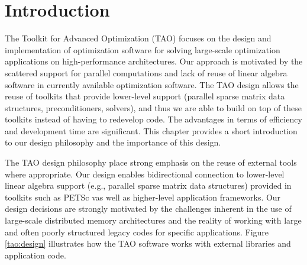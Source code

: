 \chapter{Introduction}
\label{chapter:introduction}


The Toolkit for Advanced Optimization (TAO) focuses on the design and
implementation of optimization software for 
solving large-scale optimization applications on high-performance
architectures.  Our approach is motivated by the scattered support for
parallel computations and lack of reuse of linear algebra software in
currently available optimization software.  The TAO design allows the
reuse of toolkits that provide lower-level support (parallel sparse
matrix data structures, preconditioners, solvers), and thus we are
able to build on top of these toolkits instead of having to redevelop
code. The advantages in terms of efficiency and development time are
significant.  This chapter provides a short introduction to our design 
philosophy and the importance of this design.



The TAO design philosophy place strong emphasis on the reuse of
external tools where appropriate.  Our design enables bidirectional
connection to lower-level linear algebra support (e.g., parallel sparse
matrix data structures) provided in toolkits such as PETSc
\cite{petsc-web-page,petsc,petsc-user-ref}
vas well as higher-level application
frameworks.  Our design decisions are strongly motivated by the
challenges inherent in the use of large-scale distributed memory
architectures and the reality of working with large and often poorly
structured legacy codes for specific applications.  Figure
\ref{tao:design} illustrates how the TAO software works with external
libraries and application code.

